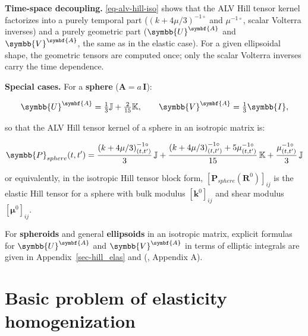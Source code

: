 \documentclass[
  a4paper,
  numbers=noendperiod,
  DIV=12]{scrreprt}
\newcommand{\uu}[1]{{\symbf{{#1}}}}
\newcommand{\uuuu}[1]{{\symbb{{#1}}}}
\newcommand{\volt}[1]{{#1}^{-1\circ}}
\begin{document}
\begin{tcolorbox}[enhanced jigsaw, arc=.35mm, bottomrule=.15mm, bottomtitle=1mm, breakable, colback=white, colbacktitle=quarto-callout-tip-color!10!white, colframe=quarto-callout-tip-color-frame, coltitle=black, left=2mm, leftrule=.75mm, opacityback=0, opacitybacktitle=0.6, rightrule=.15mm, title=\textcolor{quarto-callout-tip-color}{\faLightbulb}\hspace{0.5em}{Tip}, titlerule=0mm, toprule=.15mm, toptitle=1mm]

\textbf{Time-space decoupling.} \ref{eq-alv-hill-iso} shows that the ALV
Hill tensor kernel factorizes into a purely temporal part
(\(\volt{(k+4\mu/3)}\) and \(\volt{\mu}\), scalar Volterra inverses) and
a purely geometric part (\(\uuuu{U}^{\uu{A}}\) and
\(\uuuu{V}^{\uu{A}}\), the same as in the elastic case). For a given
ellipsoidal shape, the geometric tensors are computed once; only the
scalar Volterra inverses carry the time dependence.

\end{tcolorbox}

\textbf{Special cases.} For a \textbf{sphere} (\(\uu{A} = a\,\uu{I}\)):

\[
\uuuu{U}^{\uu{A}} = \tfrac{1}{3}\mathbb{J} + \tfrac{2}{15}\mathbb{K},
\qquad
\uuuu{V}^{\uu{A}} = \tfrac{1}{3}\uuuu{I},
\]

so that the ALV Hill tensor kernel of a sphere in an isotropic matrix
is:

\[
\uuuu{P}_{sphere}(t,t') =
\frac{\volt{(k+4\mu/3)}_{(t,t')}}{3}\,\mathbb{J}
+ \frac{\volt{(k+4\mu/3)}_{(t,t')} + 5\volt{\mu}_{(t,t')}}{15}\,\mathbb{K}
+ \frac{\volt{\mu}_{(t,t')}}{3}\,\mathbb{J}
\]

or equivalently, in the isotropic Hill tensor block form,
\([\mathbf{P}_{sphere}(\mathbf{R}^0)]_{ij}\) is the elastic Hill tensor
for a sphere with bulk modulus \([\mathbf{k}^0]_{ij}\) and shear modulus
\([\boldsymbol{\mu}^0]_{ij}\).

For \textbf{spheroids} and general \textbf{ellipsoids} in an isotropic
matrix, explicit formulas for \(\uuuu{U}^{\uu{A}}\) and
\(\uuuu{V}^{\uu{A}}\) in terms of elliptic integrals are given in
Appendix~\ref{sec-hill_elas} and
(, Appendix
A).

\chapter{Basic problem of elasticity
homogenization}\label{sec-basics_elas}
\end{document}
